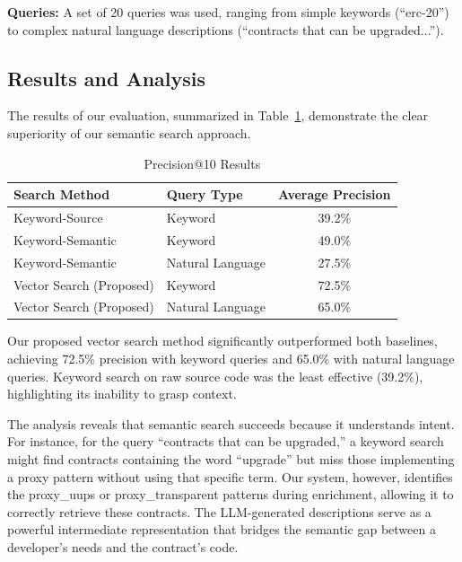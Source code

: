 \textbf{Queries:} A set of 20 queries was used, ranging from simple keywords (``erc-20'') to complex natural language descriptions (``contracts that can be upgraded...'').

\subsection{Results and Analysis}
The results of our evaluation, summarized in Table~\ref{tab:results}, demonstrate the clear superiority of our semantic search approach.

\begin{table}[htbp]
	\caption{Precision@10 Results}\label{tab:results}
	\begin{center}
		\begin{tabular}{l l c}
			\toprule
			\textbf{Search Method}   & \textbf{Query Type} & \textbf{Average Precision} \\
			\midrule
			Keyword-Source           & Keyword             & 39.2\%                     \\
			Keyword-Semantic         & Keyword             & 49.0\%                     \\
			Keyword-Semantic         & Natural Language    & 27.5\%                     \\
			Vector Search (Proposed) & Keyword             & 72.5\%                     \\
			Vector Search (Proposed) & Natural Language    & 65.0\%                     \\
			\bottomrule
		\end{tabular}
	\end{center}
\end{table}

Our proposed vector search method significantly outperformed both baselines, achieving 72.5\% precision with keyword queries and 65.0\% with natural language queries. Keyword search on raw source code was the least effective (39.2\%), highlighting its inability to grasp context.

The analysis reveals that semantic search succeeds because it understands intent. For instance, for the query ``contracts that can be upgraded,'' a keyword search might find contracts containing the word ``upgrade'' but miss those implementing a proxy pattern without using that specific term. Our system, however, identifies the proxy\_uups or proxy\_transparent patterns during enrichment, allowing it to correctly retrieve these contracts. The LLM-generated descriptions serve as a powerful intermediate representation that bridges the semantic gap between a developer's needs and the contract's code.

